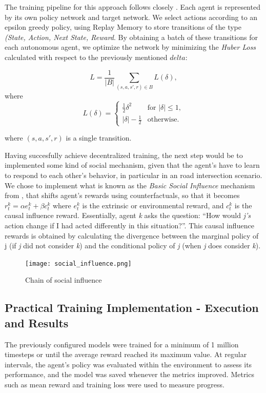 The training pipeline for this approach follows closely \cite{pytorch_rl_tutorial}. Each agent is represented by its own policy network and target network. We select actions according to an epsilon greedy policy, using Replay Memory to store transitions of the type \textit{(State, Action, Next State, Reward}. By obtaining a batch of these transitions for each autonomous agent, we optimize the network by minimizing the \textit{Huber Loss} calculated with respect to the previously mentioned $delta$:

\[
L = \frac{1}{|B|} \sum_{(s, a, s', r) \in B} L(\delta),
\]
where
\[
L(\delta) =
\begin{cases} 
\frac{1}{2}\delta^2 & \text{for } |\delta| \leq 1, \\
|\delta| - \frac{1}{2} & \text{otherwise}.
\end{cases}
\]

where $(s, a, s', r)$ is a single transition.

Having succesfully achieve decentralized training, the next step would be to implemented some kind of social mechanism, given that the agent's have to learn to respond to each other's behavior, in particular in an road intersection scenario. We chose to implement what is known as the \textit{Basic Social Influence} mechanism from \cite{jaques2019social}, that shifts agent's rewards using counterfactuals, so that it becomes $r^k_t = \alpha e^k_t + \beta c^k_t$ where $e^k_t$ is the extrinsic or environmental reward, and $c^k_t$ is the causal influence reward.  Essentially, agent \textit{k} asks the question: “How would \textit{j’s} action change if I had acted differently in this situation?”. This causal influence rewards is obtained by calculating the divergence between the marginal policy of j (if \textit{j} did not consider \textit{k}) and the conditional policy of \textit{j} (when \textit{j} does consider \textit{k}).

\begin{figure}[h]
    \centering
    \texttt{[image: social\_influence.png]}
    \caption{Chain of social influence}
    \label{fig:social influence}
\end{figure}

\subsection{Practical Training Implementation - Execution and Results}

The previously configured models were trained for a minimum of 1 million timesteps or until the average reward reached its maximum value. 
At regular intervals, the agent's policy was evaluated within the environment to assess its performance,
and the model was saved whenever the metrics improved. 
Metrics such as mean reward and training loss were used to measure progress.

